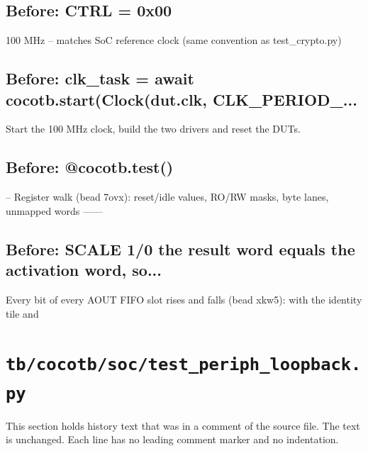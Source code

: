 \begin{record}

\subsection*{Before: CTRL = 0x00}

\begin{textblock}
100 MHz -- matches SoC reference clock (same convention as test_crypto.py)
\end{textblock}

\subsection*{Before: clk\_task = await cocotb.start(Clock(dut.clk, CLK\_PERIOD\_...}

\begin{textblock}
Start the 100 MHz clock, build the two drivers and reset the DUTs.
\end{textblock}

\subsection*{Before: @cocotb.test()}

\begin{textblock}
-- Register walk (bead 7ovx): reset/idle values, RO/RW masks, byte lanes, unmapped words ------
\end{textblock}

\subsection*{Before: SCALE 1/0 the result word equals the activation word, so...}

\begin{textblock}
Every bit of every AOUT FIFO slot rises and falls (bead xkw5): with the identity tile and
\end{textblock}

\end{record}

\section{\texttt{tb/cocotb/soc/test\_periph\_loopback.py}}\label{cr:suite:soc-test-periph-loopback}

This section holds history text that was in a comment of the source file. The text is unchanged. Each line has no leading comment marker and no indentation.

